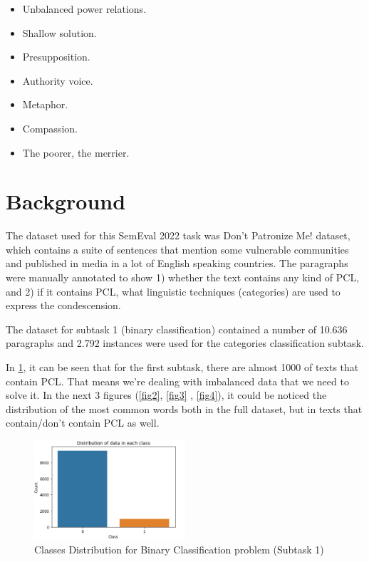 \documentclass[11pt]{article}
\begin{document}
\begin{itemize}
\item Unbalanced power relations.

\item Shallow solution.

\item Presupposition.

\item Authority voice.

\item Metaphor.

\item Compassion.

\item The poorer, the merrier.
\end{itemize}

\section{Background}

The dataset used for this SemEval 2022 task was Don't Patronize Me! dataset,
which contains a suite of sentences that mention some vulnerable communities
and published in media in a lot of English speaking countries. The
paragraphs were manually annotated to show 1) whether the text contains any
kind of PCL, and 2) if it contains PCL, what linguistic techniques
(categories) are used to express the condescension.

The dataset for subtask 1 (binary classification) contained a number of
10.636 paragraphs and 2.792 instances were used for the categories
classification subtask.

In \ref{fig1}, it can be seen that for the first subtask, there are almost
1000 of texts that contain PCL. That means we're dealing with imbalanced
data that we need to solve it. In the next 3 figures (\ref{fig2}, \ref{fig3}%
, \ref{fig4}), it could be noticed the distribution of the most common words
both in the full dataset, but in texts that contain/don't contain PCL as
well.

\begin{figure}[h]
\centering
\includegraphics[width=0.5\textwidth]{DataDistribution.png}
\caption{Classes Distribution for Binary Classification problem (Subtask 1)}
\label{fig1}
\end{figure}
\end{document}
